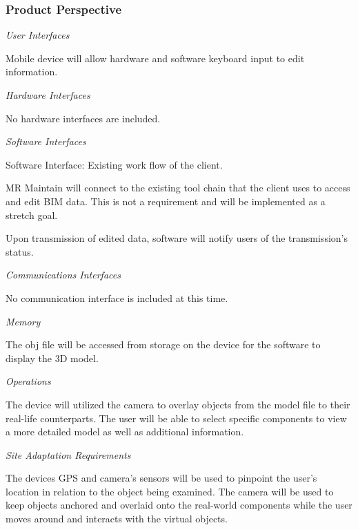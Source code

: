 \documentclass[onecolumn, draftclsnofoot,10pt, compsoc]{IEEEtran}
\begin{document}
            \subsubsection{Product Perspective}
            \textit{User Interfaces}\par
            \hangindent=10mm\noindent Mobile device will allow hardware and software keyboard input to edit information.\par
            \textit{Hardware Interfaces}\par
            \hangindent=10mm\noindent No hardware interfaces are included.\par
            \textit{Software Interfaces}\par
            \noindent\hspace{10mm}Software Interface: Existing work flow of the client.\par
            \hangindent=15mm\noindent MR Maintain will connect to the existing tool chain that the client uses to access and edit BIM data. This is not a requirement and will be implemented as a stretch goal.\par
            \noindent{}\hspace{15mm}Upon transmission of edited data, software will notify users of the transmission's status.\par
            \textit{Communications Interfaces}\par
            \hangindent=10mm\noindent No communication interface is included at this time.\par
            \textit{Memory}\par
            \hangindent=10mm\noindent The obj file will be accessed from storage on the device for the software to display the 3D model. \par
            \textit{Operations}\par
            \hangindent=10mm\noindent The device will utilized the camera to overlay objects from the model file to their real-life counterparts. The user will be able to select specific components to view a more detailed model as well as additional information. \par
            \textit{Site Adaptation Requirements}\par
            \hangindent=10mm\noindent The devices GPS and camera's sensors will be used to pinpoint the user's location in relation to the object being examined. The camera will be used to keep objects anchored and overlaid onto the real-world components while the user moves around and interacts with the virtual objects. \par
            
\end{document}
